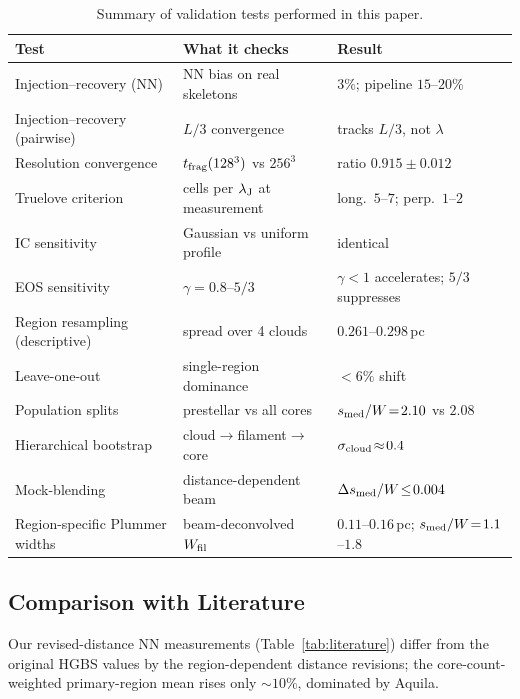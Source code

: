 \documentclass[usenatbib,twoside,twocolumn]{mnras}
\begin{document}
\begin{table}
\caption{Summary of validation tests performed in this paper.}
\label{tab:validation_summary}
\footnotesize
\setlength{\tabcolsep}{3pt}
\begin{tabular}{p{2.3cm}p{2.9cm}p{2.0cm}}
\toprule
Test & What it checks & Result \\
\midrule
Injection--recovery (NN) & NN bias on real skeletons & $3\%$; pipeline $15$--$20\%$ \\
Injection--recovery (pairwise) & $L/3$ convergence & tracks $L/3$, not $\lambda$ \\
Resolution convergence & $t_{\rm frag}(128^3)$ vs $256^3$ & ratio $0.915\pm0.012$ \\
Truelove criterion & cells per $\lambda_{\rm J}$ at measurement & long.\ $5$--$7$; perp.\ $1$--$2$ \\
IC sensitivity & Gaussian vs uniform profile & identical \\
EOS sensitivity & $\gamma=0.8$--$5/3$ & $\gamma<1$ accelerates; $5/3$ suppresses \\
Region resampling (descriptive) & spread over 4 clouds & $0.261$--$0.298$\,pc \\
Leave-one-out & single-region dominance & $<6\%$ shift \\
Population splits & prestellar vs all cores & $s_{\rm med}/W\!=\!2.10$ vs $2.08$ \\
Hierarchical bootstrap & cloud$\to$filament$\to$core & $\sigma_{\rm cloud}\!\approx\!0.4$ \\
Mock-blending & distance-dependent beam & $\Delta s_{\rm med}/W\!\le\!0.004$ \\
Region-specific Plummer widths & beam-deconvolved $W_{\rm fil}$ & $0.11$--$0.16$\,pc; $s_{\rm med}/W\!=\!1.1$--$1.8$ \\
\bottomrule
\end{tabular}
\end{table}

\subsection{Comparison with Literature}

Our revised-distance NN measurements (Table~\ref{tab:literature}) differ from the original HGBS values by the region-dependent distance revisions; the core-count-weighted primary-region mean rises only $\sim10\%$, dominated by Aquila.
\end{document}
